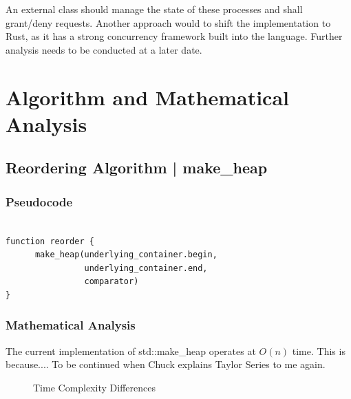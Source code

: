\documentclass{article}
\begin{document}
An external class should manage the state of these processes and shall grant/deny requests.
Another approach would to shift the implementation to Rust, as it has a strong concurrency framework built into the language.
Further analysis needs to be conducted at a later date.

\newpage

\section{Algorithm and Mathematical Analysis}

\subsection{Reordering Algorithm | make_heap}

\subsubsection{Pseudocode}

\begin{verbatim}

function reorder {
      make_heap(underlying_container.begin, 
                underlying_container.end,
                comparator)
}
\end{verbatim}

\subsubsection{Mathematical Analysis}

The current implementation of std::make_heap operates at $O(n)$ time.
This is because....
To be continued when Chuck explains Taylor Series to me again.
\begin{figure}[!h]
\centering
{}
\caption{Time Complexity Differences}
\end{figure}
\end{document}
